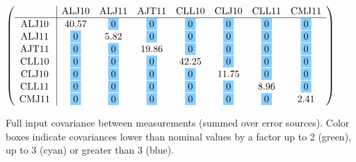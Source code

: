 \begin{table}[H]
\scriptsize
\begin{center}
\renewcommand{\arraystretch}{1.1}
\begin{math}\left(\begin{array}{c|ccccccc}
 & \mathrm{ALJ10} & 
\mathrm{ALJ11} & 
\mathrm{AJT11} & 
\mathrm{CLL10} & 
\mathrm{CLJ10} & 
\mathrm{CLL11} & 
\mathrm{CMJ11} \\
\hline
\mathrm{ALJ10} \hspace*{2pt} &      40.57 &  \colorbox{SkyBlue1}{$ 0$} &  \colorbox{SkyBlue1}{$ 0$} &  \colorbox{SkyBlue1}{$ 0$} &  \colorbox{SkyBlue1}{$ 0$} &  \colorbox{SkyBlue1}{$ 0$} &  \colorbox{SkyBlue1}{$ 0$} \\
\mathrm{ALJ11} \hspace*{2pt} &  \colorbox{SkyBlue1}{$ 0$} &       5.82 &  \colorbox{SkyBlue1}{$ 0$} &  \colorbox{SkyBlue1}{$ 0$} &  \colorbox{SkyBlue1}{$ 0$} &  \colorbox{SkyBlue1}{$ 0$} &  \colorbox{SkyBlue1}{$ 0$} \\
\mathrm{AJT11} \hspace*{2pt} &  \colorbox{SkyBlue1}{$ 0$} &  \colorbox{SkyBlue1}{$ 0$} &      19.86 &  \colorbox{SkyBlue1}{$ 0$} &  \colorbox{SkyBlue1}{$ 0$} &  \colorbox{SkyBlue1}{$ 0$} &  \colorbox{SkyBlue1}{$ 0$} \\
\mathrm{CLL10} \hspace*{2pt} &  \colorbox{SkyBlue1}{$ 0$} &  \colorbox{SkyBlue1}{$ 0$} &  \colorbox{SkyBlue1}{$ 0$} &      42.25 &  \colorbox{SkyBlue1}{$ 0$} &  \colorbox{SkyBlue1}{$ 0$} &  \colorbox{SkyBlue1}{$ 0$} \\
\mathrm{CLJ10} \hspace*{2pt} &  \colorbox{SkyBlue1}{$ 0$} &  \colorbox{SkyBlue1}{$ 0$} &  \colorbox{SkyBlue1}{$ 0$} &  \colorbox{SkyBlue1}{$ 0$} &      11.75 &  \colorbox{SkyBlue1}{$ 0$} &  \colorbox{SkyBlue1}{$ 0$} \\
\mathrm{CLL11} \hspace*{2pt} &  \colorbox{SkyBlue1}{$ 0$} &  \colorbox{SkyBlue1}{$ 0$} &  \colorbox{SkyBlue1}{$ 0$} &  \colorbox{SkyBlue1}{$ 0$} &  \colorbox{SkyBlue1}{$ 0$} &       8.96 &  \colorbox{SkyBlue1}{$ 0$} \\
\mathrm{CMJ11} \hspace*{2pt} &  \colorbox{SkyBlue1}{$ 0$} &  \colorbox{SkyBlue1}{$ 0$} &  \colorbox{SkyBlue1}{$ 0$} &  \colorbox{SkyBlue1}{$ 0$} &  \colorbox{SkyBlue1}{$ 0$} &  \colorbox{SkyBlue1}{$ 0$} &       2.41 \\
\end{array}\right)\end{math}
\caption{Full input covariance between measurements (summed over error sources). Color boxes indicate covariances lower than nominal values by a factor up to 2 (green), up to 3 (cyan) or greater than 3 (blue).}
\renewcommand{\arraystretch}{1}
\end{center}
\end{table}
